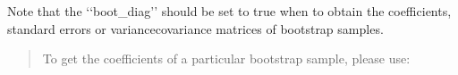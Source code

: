 \documentclass[letterpaper,10pt,english]{sphinxmanual}
\begin{document}
\sphinxAtStartPar
Note that the ‘‘boot\_diag’’ should be set to true when to obtain the coefficients, standard errors or variance\sphinxhyphen{}covariance matrices
of bootstrap samples.
\begin{quote}

\sphinxAtStartPar
To get the coefficients of a particular bootstrap sample, please use:
\begin{quote}

\begin{sphinxVerbatim}[commandchars=\\\{\}]
\PYG{p}{[}\PYG{p}{]}\PYG{p}{[}\PYG{p}{]}
\end{sphinxVerbatim}
\end{quote}
\end{quote}
\end{document}
